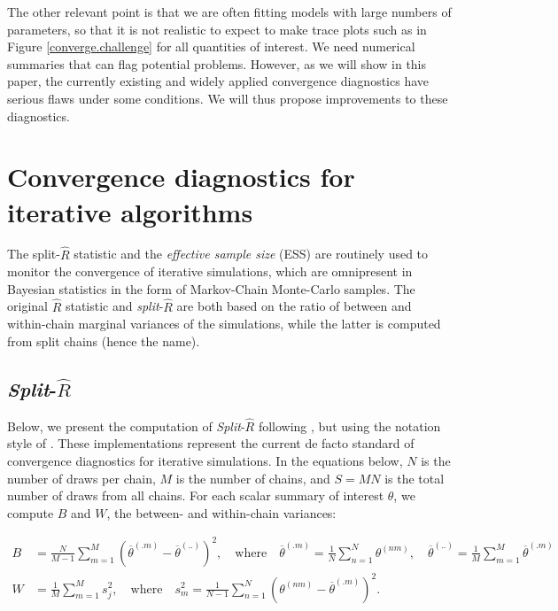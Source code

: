\documentclass[american,]{article}
\begin{document}
The other relevant point is that we are often fitting models with large
numbers of parameters, so that it is not realistic to expect to make
trace plots such as in Figure \ref{converge.challenge} for all
quantities of interest. We need numerical summaries that can flag
potential problems. However, as we will show in this paper, the
currently existing and widely applied convergence diagnostics have
serious flaws under some conditions. We will thus propose improvements
to these diagnostics.

\hypertarget{CD}{%
\section{Convergence diagnostics for iterative algorithms}\label{CD}}

The split-\(\widehat{R}\) statistic and the \emph{effective sample size}
(ESS) are routinely used to monitor the convergence of iterative
simulations, which are omnipresent in Bayesian statistics in the form of
Markov-Chain Monte-Carlo samples. The original \(\widehat{R}\) statistic
\citep{Gelman+Rubin:1992, Brooks+Gelman:1998} and
\emph{split}-\(\widehat{R}\) \citep{BDA3} are both based on the ratio of
between and within-chain marginal variances of the simulations, while
the latter is computed from split chains (hence the name).

\hypertarget{SplitRhat}{%
\subsection{\texorpdfstring{\emph{Split}-\(\widehat{R}\)}{Split-\textbackslash{}widehat\{R\}}}\label{SplitRhat}}

Below, we present the computation of \emph{Split}-\(\widehat{R}\)
following \citet{BDA3}, but using the notation style of
\citet{StanBook}. These implementations represent the current de facto
standard of convergence diagnostics for iterative simulations. In the
equations below, \(N\) is the number of draws per chain, \(M\) is the
number of chains, and \(S=MN\) is the total number of draws from all
chains. For each scalar summary of interest \(\theta\), we compute \(B\)
and \(W\), the between- and within-chain variances:

\begin{align}
B &= \frac{N}{M-1}\sum_{m=1}^{M}(\overline{\theta}^{(.m)} - 
\overline{\theta}^{(..)})^2, \quad \mbox{where} \quad 
\overline{\theta}^{(.m)}=\frac{1}{N}\sum_{n=1}^N \theta^{(nm)}, \quad
\overline{\theta}^{(..)} = \frac{1}{M}\sum_{m=1}^M\overline{\theta}^{(.m)} 
\\
W &= \frac{1}{M}\sum_{m=1}^{M}s_j^2, \quad \mbox{where} \quad
s_m^2=\frac{1}{N-1} \sum_{n=1}^N (\theta^{(nm)}-\overline{\theta}^{(.m)})^2.
\end{align}
\end{document}
